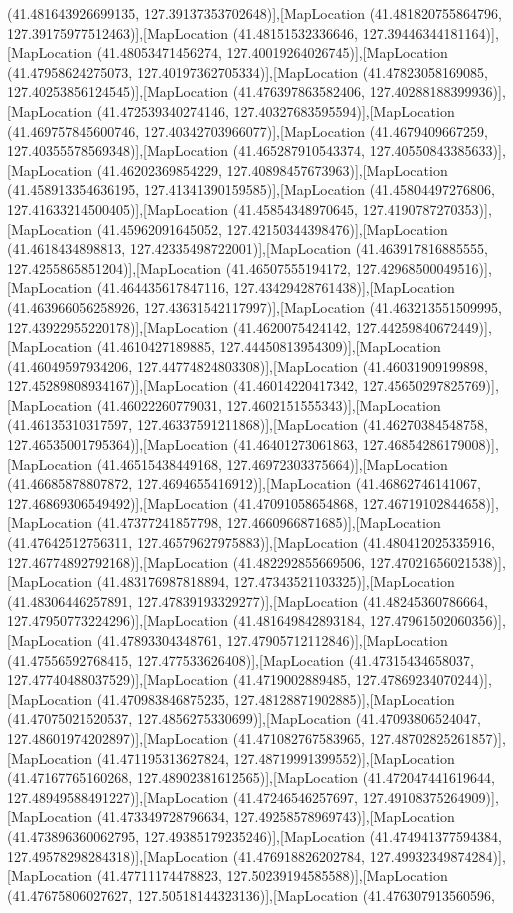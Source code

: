 (41.481643926699135, 127.39137353702648)],[MapLocation (41.481820755864796, 127.39175977512463)],[MapLocation (41.48151532336646, 127.39446344181164)],[MapLocation (41.48053471456274, 127.40019264026745)],[MapLocation (41.47958624275073, 127.40197362705334)],[MapLocation (41.47823058169085, 127.40253856124545)],[MapLocation (41.476397863582406, 127.40288188399936)],[MapLocation (41.472539340274146, 127.40327683595594)],[MapLocation (41.469757845600746, 127.40342703966077)],[MapLocation (41.4679409667259, 127.40355578569348)],[MapLocation (41.465287910543374, 127.40550843385633)],[MapLocation (41.46202369854229, 127.40898457673963)],[MapLocation (41.458913354636195, 127.41341390159585)],[MapLocation (41.45804497276806, 127.41633214500405)],[MapLocation (41.45854348970645, 127.4190787270353)],[MapLocation (41.45962091645052, 127.42150344398476)],[MapLocation (41.4618434898813, 127.42335498722001)],[MapLocation (41.463917816885555, 127.4255865851204)],[MapLocation (41.46507555194172, 127.42968500049516)],[MapLocation (41.464435617847116, 127.43429428761438)],[MapLocation (41.463966056258926, 127.43631542117997)],[MapLocation (41.463213551509995, 127.43922955220178)],[MapLocation (41.4620075424142, 127.44259840672449)],[MapLocation (41.4610427189885, 127.44450813954309)],[MapLocation (41.46049597934206, 127.44774824803308)],[MapLocation (41.46031909199898, 127.45289808934167)],[MapLocation (41.46014220417342, 127.45650297825769)],[MapLocation (41.46022260779031, 127.4602151555343)],[MapLocation (41.46135310317597, 127.46337591211868)],[MapLocation (41.46270384548758, 127.46535001795364)],[MapLocation (41.46401273061863, 127.46854286179008)],[MapLocation (41.46515438449168, 127.46972303375664)],[MapLocation (41.46685878807872, 127.4694655416912)],[MapLocation (41.46862746141067, 127.46869306549492)],[MapLocation (41.47091058654868, 127.46719102844658)],[MapLocation (41.47377241857798, 127.4660966871685)],[MapLocation (41.47642512756311, 127.46579627975883)],[MapLocation (41.480412025335916, 127.46774892792168)],[MapLocation (41.482292855669506, 127.47021656021538)],[MapLocation (41.483176987818894, 127.47343521103325)],[MapLocation (41.48306446257891, 127.47839193329277)],[MapLocation (41.48245360786664, 127.47950773224296)],[MapLocation (41.481649842893184, 127.47961502060356)],[MapLocation (41.47893304348761, 127.47905712112846)],[MapLocation (41.47556592768415, 127.477533626408)],[MapLocation (41.47315434658037, 127.47740488037529)],[MapLocation (41.4719002889485, 127.47869234070244)],[MapLocation (41.470983846875235, 127.48128871902885)],[MapLocation (41.47075021520537, 127.4856275330699)],[MapLocation (41.47093806524047, 127.48601974202897)],[MapLocation (41.471082767583965, 127.48702825261857)],[MapLocation (41.471195313627824, 127.48719991399552)],[MapLocation (41.47167765160268, 127.48902381612565)],[MapLocation (41.472047441619644, 127.48949588491227)],[MapLocation (41.47246546257697, 127.49108375264909)],[MapLocation (41.473349728796634, 127.49258578969743)],[MapLocation (41.473896360062795, 127.49385179235246)],[MapLocation (41.474941377594384, 127.49578298284318)],[MapLocation (41.476918826202784, 127.49932349874284)],[MapLocation (41.47711174478823, 127.50239194585588)],[MapLocation (41.47675806027627, 127.50518144323136)],[MapLocation (41.476307913560596, 